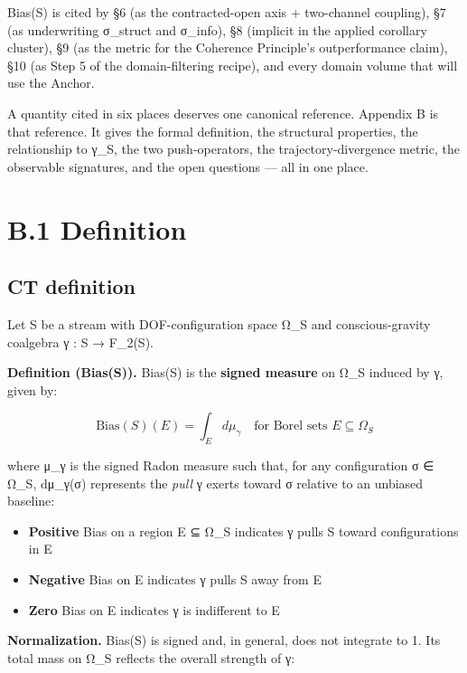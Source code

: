 \documentclass[11pt, openany]{book}
\newcommand{\sectionbreak}{\clearpage}
\begin{document}
Bias(S) is cited by §6 (as the contracted-open axis + two-channel coupling), §7 (as underwriting σ\_\allowbreak{}struct and σ\_\allowbreak{}info), §8 (implicit in the applied corollary cluster), §9 (as the metric for the Coherence Principle's outperformance claim), §10 (as Step 5 of the domain-filtering recipe), and every domain volume that will use the Anchor.

A quantity cited in six places deserves one canonical reference. Appendix B is that reference. It gives the formal definition, the structural properties, the relationship to γ\_\allowbreak{}S, the two push-operators, the trajectory-divergence metric, the observable signatures, and the open questions --- all in one place.

\sectionbreak

\section{B.1 Definition}

\subsection{CT definition}

Let S be a stream with DOF-configuration space Ω\_\allowbreak{}S and conscious-gravity coalgebra γ : S → F\_\allowbreak{}2(S).

\textbf{Definition (Bias(S)).} Bias(S) is the \textbf{signed measure} on Ω\_\allowbreak{}S induced by γ, given by:

$$\text{Bias}(S)(E) = \int_E d\mu_\gamma \quad \text{for Borel sets } E \subseteq \Omega_S$$

where μ\_\allowbreak{}γ is the signed Radon measure such that, for any configuration σ ∈ Ω\_\allowbreak{}S, dμ\_\allowbreak{}γ(σ) represents the \textit{pull} γ exerts toward σ relative to an unbiased baseline:

\begin{itemize}
\item \textbf{Positive} Bias on a region E ⊆ Ω\_\allowbreak{}S indicates γ pulls S toward configurations in E
\item \textbf{Negative} Bias on E indicates γ pulls S away from E
\item \textbf{Zero} Bias on E indicates γ is indifferent to E
\end{itemize}

\textbf{Normalization.} Bias(S) is signed and, in general, does not integrate to 1. Its total mass on Ω\_\allowbreak{}S reflects the overall strength of γ:
\end{document}
